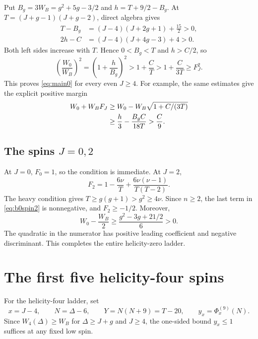 \documentclass[11pt]{article}
\theoremstyle{remark}
\numberwithin{equation}{section}
\newcommand{\WB}{W_B}
\newcommand{\Ph}{\Phi}
\begin{document}
Put $B_g=3\WB=g^2+5g-3/2$ and $h=T+9/2-B_g$.
At $T=(J+g-1)(J+g-2)$, direct algebra gives
\begin{align}
 T-B_g&=(J-4)(J+2g+1)+\frac{15}{2}>0,\label{eq:weightslack1}\\
 2h-C&=(J-4)(J+4g-3)+4>0.\label{eq:weightslack2}
\end{align}
Both left sides increase with $T$. Hence $0<B_g<T$ and $h>C/2$, so
\begin{equation}
 \left(\frac{W_0}{\WB}\right)^2
 =\left(1+\frac h{B_g}\right)^2
 >1+\frac C{T}>1+\frac C{3T}\ge F_J^2.
 \label{eq:b0weighted}
\end{equation}
This proves \eqref{eq:main0} for every even $J\ge4$.
For example, the same estimates give the explicit positive margin
\begin{align}
 W_0+\WB F_J
 &\ge W_0-\WB\sqrt{1+C/(3T)}\notag\\
 &\ge\frac h3-\frac{B_gC}{18T}
 >\frac C9.
 \label{eq:b0margin}
\end{align}

\subsection{The spins \texorpdfstring{$J=0,2$}{J=0,2}}

At $J=0$, $F_0=1$, so the condition is immediate. At $J=2$,
\begin{equation}
 F_2=1-\frac{6\nu}{T}+\frac{6\nu(\nu-1)}{T(T-2)}.
 \label{eq:b0spin2}
\end{equation}
The heavy condition gives $T\ge g(g+1)>g^2\ge4\nu$.
Since $n\ge2$, the last term in \eqref{eq:b0spin2} is nonnegative,
and $F_2\ge-1/2$. Moreover,
\begin{equation}
 W_0-\frac{\WB}{2}
 \ge\frac{g^2-3g+21/2}{6}>0.
 \label{eq:b0spin2weight}
\end{equation}
The quadratic in the numerator has positive leading coefficient and negative
discriminant. This completes the entire helicity-zero ladder.

\section{The first five helicity-four spins}
\label{sec:b4low}

For the helicity-four ladder, set
\begin{equation}
 x=J-4,\qquad N=\Delta-6,\qquad Y=N(N+9)=T-20,
 \qquad y_x=\Ph_x^{(9)}(N).
 \label{eq:b4variables}
\end{equation}
Since $W_4(\Delta)\ge\WB$ for $\Delta\ge J+g$ and $J\ge4$,
the one-sided bound $y_x\le1$ suffices at any fixed low spin.
\end{document}
